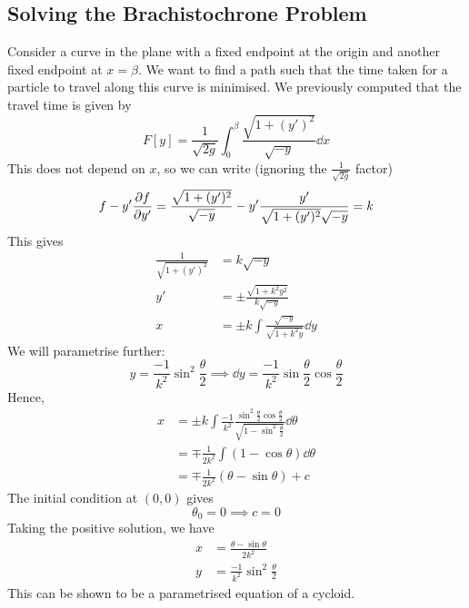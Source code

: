 \subsection{Solving the Brachistochrone Problem}
Consider a curve in the plane with a fixed endpoint at the origin and another fixed endpoint at \(x = \beta\). We want to find a path such that the time taken for a particle to travel along this curve is minimised. We previously computed that the travel time is given by
\[ F[y] = \frac{1}{\sqrt{2g}} \int_0^\beta \frac{\sqrt{1 + (y')^2}}{\sqrt{-y}} \dd{x} \]
This does not depend on \(x\), so we can write (ignoring the \( \frac{1}{\sqrt{2g}} \) factor)
\[
    f - y' \pdv{f}{y'} = \frac{\sqrt{1 + (y')^2}}{\sqrt{-y}} - y' \frac{y'}{\sqrt{1 + (y')^2} \sqrt{-y}} = k
\]
This gives
\begin{align*}
    \frac{1}{\sqrt{1 + (y')^2}} &= k \sqrt{-y} \\
    y' &= \pm \frac{\sqrt{1 + k^2 y^2}}{k\sqrt{-y}} \\
    x &= \pm k \int \frac{\sqrt{-y}}{\sqrt{1 + k^2 y}} \dd{y}
\end{align*}
We will parametrise further:
\[ y = \frac{-1}{k^2} \sin^2 \frac{\theta}{2} \implies \dd{y} = \frac{-1}{k^2}\sin \frac{\theta}{2} \cos\frac{\theta}{2} \]
Hence,
\begin{align*}
    x &= \pm k \int \frac{-1}{k^2} \frac{\sin^2 \frac{\theta}{2} \cos \frac{\theta}{2}}{\sqrt{1 - \sin^2 \frac{\theta}{2}}} \dd{\theta} \\
    &= \mp \frac{1}{2k^2} \int (1 - \cos\theta) \dd{\theta} \\
    &= \mp \frac{1}{2k^2}(\theta - \sin\theta) + c
\end{align*}
The initial condition at \((0, 0)\) gives
\[ \theta_0 = 0 \implies c = 0 \]
Taking the positive solution, we have
\begin{align*}
    x &= \frac{\theta - \sin\theta}{2k^2} \\
    y &= \frac{-1}{k^2} \sin^2 \frac{\theta}{2}
\end{align*}
This can be shown to be a parametrised equation of a cycloid.

